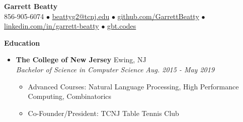 \documentclass[letterpaper,10pt]{article}
\newcommand{\resitem}[1]{\item #1 \vspace{-2pt}}
\newcommand{\resheading}[1]{{\large \colorbox{mygrey}{\begin{minipage}{\textwidth}{\textbf{#1 \vphantom{p\^{E}}}}\end{minipage}}}}
\newcommand{\ressubheading}[4]{%
  \item\textbf{#1} \hfill #2\null\\
  \textit{#3} \hfill \textit{#4}%
  \vspace{-5pt}
}%
\begin{document}
\begin{center}
\textbf{\Huge Garrett Beatty} \\
\vspace{0.05in}
856-905-6074 $\bullet$ \href{mailto:beattyg2@tcnj.edu}{beattyg2@tcnj.edu} $\bullet$ \href{http://github.com/GarrettBeatty}{github.com/GarrettBeatty} $\bullet$ \href{http://linkedin.com/in/garrett-beatty}{linkedin.com/in/garrett-beatty} $\bullet$ \href{https://gbt.codes}{gbt.codes}
\end{center}

\vspace{-0.05in}

\resheading{Education}
\begin{itemize}

\ressubheading{The College of New Jersey}{Ewing, NJ}{Bachelor of Science in Computer Science}{Aug. 2015 - May 2019}
	\begin{itemize}
		\resitem{Advanced Courses: Natural Language Processing, High Performance Computing, Combinatorics}
		\resitem{Co-Founder/President: TCNJ Table Tennis Club}
	\end{itemize}
\end{itemize}
\end{document}
